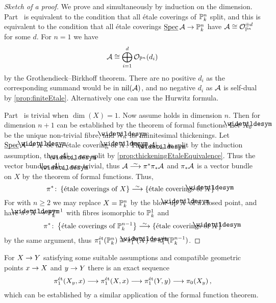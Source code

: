 \documentclass[a4paper, 10pt, oneside, DIV=9, chapterprefix=true, numbers=enddot, bibliography=totoc]{scrbook}
\begin{document}
\begin{proof}[Sketch of a proof]
	We prove  and  simultaneously by induction on the dimension. Part~ is equivalent to the condition that all étale coverings of $\mathbb{P}_k^n$ split, and this is equivalent to the condition that all étale coverings $\SPEC\Aa\morphism\IP_k^n$ have $\mathcal{A}\cong \mathcal{O}_{\mathbb{P}^n}^{\oplus d}$ for some $d$. For $n=1$ we have
	\begin{equation*}
		\mathcal{A}\cong \bigoplus_{i=1}^d\mathcal{O}_{\mathbb{P}^n}(d_i)
	\end{equation*}
	by the Grothendieck--Birkhoff theorem. There are no positive $d_i$ as the corresponding summand would be in $\operatorname{nil}(\mathcal{A})$, and no negative $d_i$ as $\mathcal{A}$ is self-dual by \cref{prop:finiteEtale}. Alternatively one can use the Hurwitz formula.
	
	Part~ is trivial when $\dim(X)=1$. Now assume  holds in dimension $n$. Then  for dimension $n+1$ can be established by the theorem of formal functions. Let $\snake{X}_0$ be the unique non-trivial fibre, and $\snake{X}_n$ its infinitesimal thickenings. Let $\SPEC\Aa\morphism\snake{X}$ be an étale covering of $\snake{X}$. Then $\Aa|_{\snake{X}_0}$ is split by the induction assumption, then $\Aa|_{\snake{X}_n}$ are split by \cref{prop:thickeningEtaleEquivalence}. Thus the vector bundles $\Aa|_{\snake{X}_n}$ are trivial, thus $\Aa\isomorphism\pi^*\pi_*\Aa$ and $\pi_*\mathcal{A}$ is a vector bundle on $X$ by the theorem of formal functions. Thus,
	\begin{equation*}
		\pi^*\colon\left\{\text{étale coverings of $X$}\right\}\isomorphism\left\{\text{étale coverings of $\snake{X}$}\right\}\,.
	\end{equation*}
	For  with $n\geq 2$ we may replace $X=\mathbb{P}_k^n$ by the blow-up $\snake{X}$ of a closed point, and have $\pi\colon \snake{X}\morphism\IP_k^{n-1}$ with fibres isomorphic to $\mathbb{P}_k^1$ and
	\begin{equation*}
	\pi^*\colon\left\{\text{étale coverings of $\IP_k^{n-1}$}\right\}\isomorphism\left\{\text{étale coverings of $\snake{X}$}\right\}
	\end{equation*}
	by the same argument, thus $\pi_1^\et(\IP_k^n)\cong \pi_1^\et(\snake{X})\cong \pi_1^\et(\IP_k^{n-1})$.
\end{proof}
\begin{rem}
	For $X\morphism Y$ satisfying some suitable assumptions and compatible geometric points $x\morphism X$ and $y\morphism Y$ there is an exact sequence
	\begin{equation*}
		\pi_1^\et(X_y,x)\morphism\pi_1^\et(X,x)\morphism\pi_1^\et(Y,y)\morphism\pi_0(X_y)\,,
	\end{equation*}
	which can be established by a similar application of the formal function theorem.
\end{rem}
\end{document}
